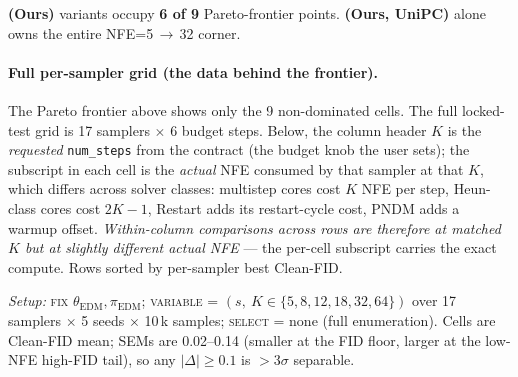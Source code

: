\documentclass[11pt]{article}
\begin{document}
\noindent
\textbf{(Ours)} variants occupy \textbf{6 of 9} Pareto-frontier points.
\textbf{(Ours, UniPC)} alone owns the entire NFE=5\,\(\to\)\,32 corner.

\paragraph{Full per-sampler grid (the data behind the frontier).}
The Pareto frontier above shows only the 9 non-dominated cells. The
full locked-test grid is 17 samplers \(\times\) 6 budget steps. Below,
the column header \(K\) is the \emph{requested} \texttt{num\_steps}
from the contract (the budget knob the user sets); the subscript in
each cell is the \emph{actual} NFE consumed by that sampler at that
\(K\), which differs across solver classes: multistep cores cost
\(K\) NFE per step, Heun-class cores cost \(2K{-}1\), Restart adds
its restart-cycle cost, PNDM adds a warmup offset. \emph{Within-column
comparisons across rows are therefore at matched \(K\) but at slightly
different actual NFE} --- the per-cell subscript carries the exact
compute. Rows sorted by per-sampler best Clean-FID.

\noindent\textit{Setup:} \textsc{fix} \(\theta_{\mathrm{EDM}},
\pi_{\mathrm{EDM}}\); \textsc{variable} = \((s,\ K \in \{5,8,12,18,32,64\})\)
over 17 samplers \(\times\) 5 seeds \(\times\) 10\,k samples;
\textsc{select} = none (full enumeration). Cells are Clean-FID mean;
SEMs are 0.02--0.14 (smaller at the FID floor, larger at the low-NFE
high-FID tail), so any \(|\Delta| \ge 0.1\) is \(>3\sigma\) separable.
\end{document}
